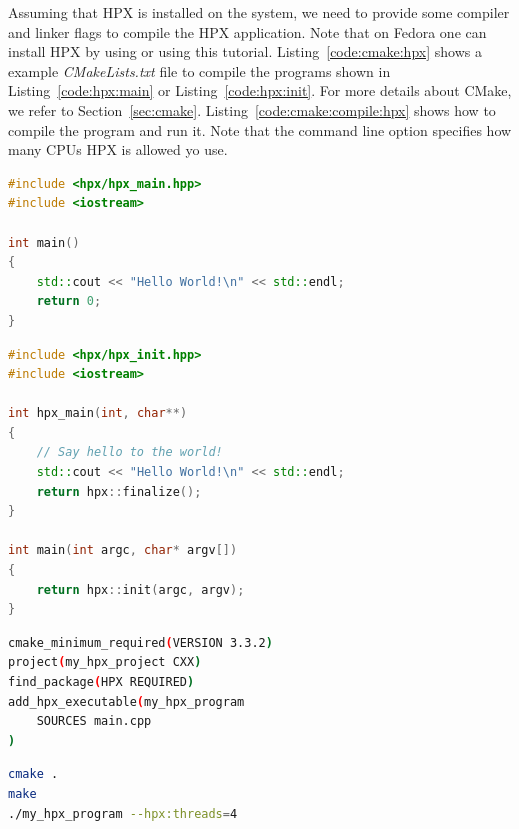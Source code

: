\documentclass[11pt,fleqn]{book} %
\begin{document}
Assuming that HPX is installed on the system, we need to provide some compiler and linker flags to compile the HPX application. Note that on Fedora one can install HPX by using  or using this
tutorial. Listing~\ref{code:cmake:hpx} shows a example \textit{CMakeLists.txt} file to compile the programs shown in Listing~\ref{code:hpx:main} or Listing~\ref{code:hpx:init}. For more details about CMake, we refer to Section~\ref{sec:cmake}. Listing~\ref{code:cmake:compile:hpx} shows how to compile the program and run it. Note that the command line option  specifies how many CPUs HPX is allowed yo use. 


\begin{lstlisting}[language=c++,caption={Initializing the HPX runtime system (I).\label{code:hpx:main}},float,floatplacement=tb]
#include <hpx/hpx_main.hpp>
#include <iostream>

int main()
{
    std::cout << "Hello World!\n" << std::endl;
    return 0;
}
\end{lstlisting}


\begin{lstlisting}[language=c++,caption={Initializing the HPX runtime system (II).\label{code:hpx:init}},float,floatplacement=tb]
#include <hpx/hpx_init.hpp>
#include <iostream>

int hpx_main(int, char**)
{
    // Say hello to the world!
    std::cout << "Hello World!\n" << std::endl;
    return hpx::finalize();
}

int main(int argc, char* argv[])
{
    return hpx::init(argc, argv);
}
\end{lstlisting}


\begin{minipage}{\linewidth}
\begin{minipage}{0.45\linewidth}
\begin{lstlisting}[language=bash,caption={Content of the CMakeLists.txt to build HPX applications.\label{code:cmake:hpx}},emph={project, add_executable,cmake_minimum_required},emphstyle={\color{azure}\bfseries}]
cmake_minimum_required(VERSION 3.3.2)
project(my_hpx_project CXX)
find_package(HPX REQUIRED)
add_hpx_executable(my_hpx_program
    SOURCES main.cpp
)
\end{lstlisting}
\end{minipage}
\hfill
\begin{minipage}{0.45\linewidth}
\begin{lstlisting}[language=bash,caption={Build instructions for CMake.\label{code:cmake:compile:hpx}}]
cmake .
make
./my_hpx_program --hpx:threads=4
\end{lstlisting}
\end{minipage}
\end{minipage}
\end{document}
